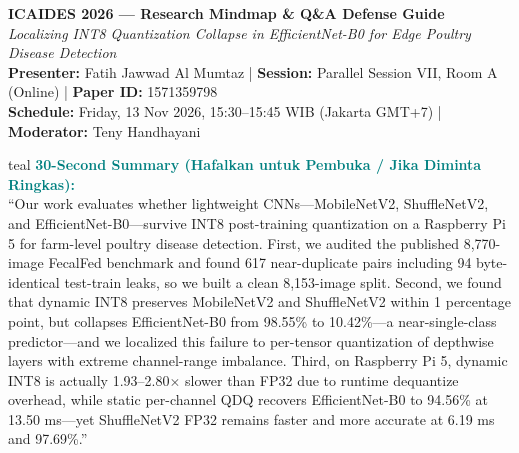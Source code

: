 \documentclass[10pt,a4paper]{article}
\begin{document}
\begin{tcolorbox}[
  enhanced,
  colback=navy,
  colframe=navy,
  coltext=white,
  arc=4pt,
  left=10pt, right=10pt, top=8pt, bottom=8pt
]
\begin{center}
{\Large\bfseries ICAIDES 2026 --- Research Mindmap \& Q\&A Defense Guide}\\[4pt]
{\normalsize\textit{Localizing INT8 Quantization Collapse in EfficientNet-B0 for Edge Poultry Disease Detection}}\\[6pt]
\small
\textbf{Presenter:} Fatih Jawwad Al Mumtaz \quad|\quad
\textbf{Session:} Parallel Session VII, Room A (Online) \quad|\quad
\textbf{Paper ID:} 1571359798\\[2pt]
\textbf{Schedule:} Friday, 13 Nov 2026, 15:30--15:45 WIB (Jakarta GMT+7) \quad|\quad
\textbf{Moderator:} Teny Handhayani
\end{center}
\end{tcolorbox}

\begin{infobox}{teal}
\textbf{\textcolor{teal}{30-Second Summary (Hafalkan untuk Pembuka / Jika Diminta Ringkas):}}\\
``Our work evaluates whether lightweight CNNs---MobileNetV2, ShuffleNetV2, and EfficientNet-B0---survive INT8 post-training quantization on a Raspberry Pi 5 for farm-level poultry disease detection. First, we audited the published 8,770-image FecalFed benchmark and found 617 near-duplicate pairs including 94 byte-identical test-train leaks, so we built a clean 8,153-image split. Second, we found that dynamic INT8 preserves MobileNetV2 and ShuffleNetV2 within 1 percentage point, but collapses EfficientNet-B0 from 98.55\% to 10.42\%---a near-single-class predictor---and we localized this failure to per-tensor quantization of depthwise layers with extreme channel-range imbalance. Third, on Raspberry Pi 5, dynamic INT8 is actually 1.93--2.80$\times$ slower than FP32 due to runtime dequantize overhead, while static per-channel QDQ recovers EfficientNet-B0 to 94.56\% at 13.50 ms---yet ShuffleNetV2 FP32 remains faster and more accurate at 6.19 ms and 97.69\%.''
\end{infobox}

\end{document}
